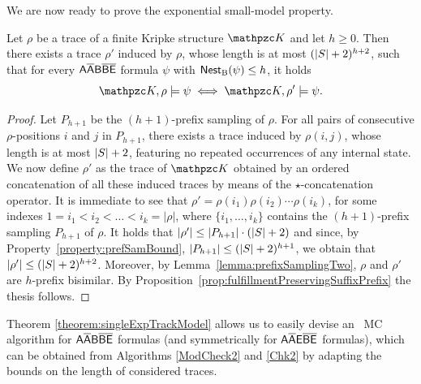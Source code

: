 We are now ready to prove the exponential small-model property.
%
\begin{theorem}\label{theorem:singleExpTrackModel}
Let $\rho$ be a trace of a finite Kripke structure $\Ku$ and let $h\geq 0$.
Then there exists a trace $\rho'$ induced by $\rho$, whose length is at most $(|S|+2)^{h+2}$, such that for every $\mathsf{A\overline{A}B\overline{B}\overline{E}}$ formula $\psi$  with $\operatorname{\mathsf{Nest}_B}(\psi)\leq h$, it holds 
\[\Ku,\rho\models \psi\iff \Ku,\rho'\models \psi.\]
\end{theorem}
\begin{proof} Let $P_{h+1}$ be the $(h+1)$-prefix sampling of $\rho$. For all pairs of consecutive $\rho$-positions $i$ and $j$ in $P_{h+1}$,
there exists a trace induced by $\rho(i,j)$, whose length is at most $|S|+2$, featuring no repeated occurrences of any internal state.
We now define $\rho'$ as the trace of $\Ku$ obtained by an ordered concatenation of all these induced traces by means of the $\star$-concatenation operator.
It is immediate to see that $\rho'=\rho(i_1)\rho(i_2)\cdots \rho(i_k)$, for some indexes $1= i_1<i_2 <\ldots < i_k=|\rho|$, where
$\{i_1,\ldots,i_k\}$ contains the $(h+1)$-prefix sampling $P_{h+1}$ of $\rho$. It holds that $|\rho'|\leq |P_{h+1}|\cdot (|S|+2)$ and since, by Property~\ref{property:prefSamBound}, $|P_{h+1}|\leq (|S|+2)^{h+1}$, we obtain that $|\rho'|\leq (|S|+2)^{h+2}$. Moreover, by Lemma~\ref{lemma:prefixSamplingTwo}, $\rho$ and $\rho'$ are $h$-prefix bisimilar. By Proposition~\ref{prop:fulfillmentPreservingSuffixPrefix} the thesis follows.
\end{proof}

Theorem \ref{theorem:singleExpTrackModel} allows us to easily devise an \EXPSPACE\ MC algorithm for $\mathsf{A\overline{A}B\overline{B}\overline{E}}$ formulas (and symmetrically for $\mathsf{A\overline{A}E\overline{B}\overline{E}}$ formulas), which can be obtained from Algorithms \ref{ModCheck2} and \ref{Chk2} by adapting the bounds on the length of considered traces.

